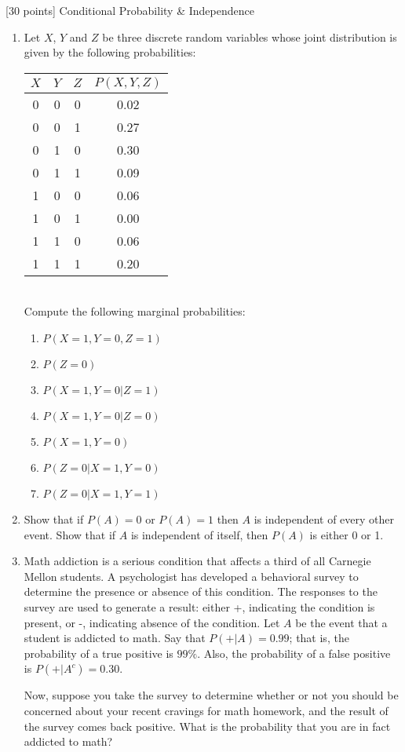 [30 points] Conditional Probability \& Independence\\

\begin{enumerate}

\item Let $X$, $Y$ and $Z$ be three discrete random variables whose joint distribution is given by the following probabilities:\\

\begin{tabular}{|c|c|c|c|}
\hline
$X$ & $Y$ & $Z$ & $P(X,Y,Z)$ \\
\hline
0 & 0 & 0 & 0.02 \\
0 & 0 & 1 & 0.27 \\
0 & 1 & 0 & 0.30 \\
0 & 1 & 1 & 0.09 \\
1 & 0 & 0 & 0.06 \\
1 & 0 & 1 & 0.00 \\
1 & 1 & 0 & 0.06 \\
1 & 1 & 1 & 0.20 \\
\hline
\end{tabular}\\

Compute the following marginal probabilities:\\
\begin{enumerate}
\item $P(X = 1, Y = 0, Z = 1)$
\item $P(Z = 0)$
\item $P(X = 1, Y = 0|Z = 1)$
\item $P(X = 1, Y = 0|Z = 0)$
\item $P(X = 1, Y = 0)$
\item $P(Z = 0|X = 1, Y = 0)$
\item $P(Z = 0|X = 1, Y = 1)$\\
\end{enumerate}

\item 

Show that if $P(A) = 0$ or $P(A) = 1$ then $A$ is independent of every other event. Show that if $A$ is independent of itself, then $P(A)$ is either 0 or 1.\\

\item 

Math addiction is a serious condition that affects a third of all Carnegie Mellon students. A psychologist has developed a behavioral survey to determine the presence or absence of this condition. The responses to the survey are used to generate a result: either +, indicating the condition is present, or -, indicating absence of the condition. Let \(A\) be the event that a student is addicted to math. Say that \(P(+|A) = 0.99\); that is, the probability of a true positive is \(99\%\). Also, the probability of a false positive is \(P(+|A^{c}) = 0.30\).

Now, suppose you take the survey to determine whether or not you should be concerned about your recent cravings for math homework, and the result of the survey comes back positive. What is the probability that you are in fact addicted to math?

\end{enumerate}